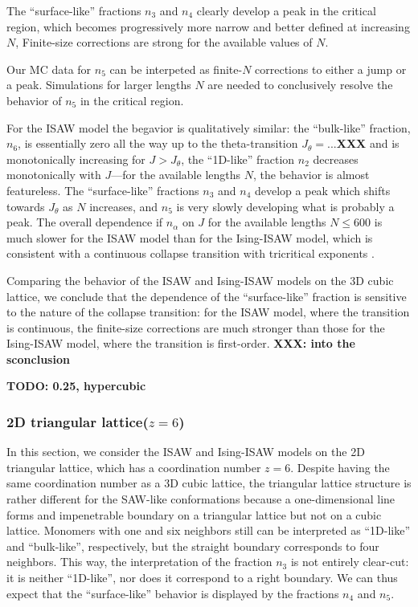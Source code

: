 \documentclass[a4paper]{jpconf}
\begin{document}
The ``surface-like'' fractions $n_3$ and $n_4$ clearly develop a peak in the
critical region, which becomes progressively more narrow and better defined 
at increasing $N$, Finite-size corrections are strong for the available values of $N$. 

Our MC data for $n_5$ can be interpeted as
finite-$N$ corrections to either a jump or a peak. Simulations for 
larger lengths $N$ are needed to conclusively resolve the behavior of $n_5$
in the critical region. 

For the ISAW model the begavior is qualitatively similar: the ``bulk-like''
fraction, $n_6$, is essentially zero all the way up to the theta-transition $J_\theta =...$\textbf{XXX}
and is monotonically increasing for $J > J_\theta$, the ``1D-like'' fraction $n_2$
decreases monotonically with $J$---for the available lengths $N$, the behavior
is almost featureless. The ``surface-like'' fractions $n_3$ and $n_4$ develop
a peak which shifts towards $J_\theta$ as $N$ increases, and $n_5$ is very
slowly developing what is probably a peak. 
The overall dependence if $n_\alpha$ on $J$ for the available lengths
$N \leqslant 600$ is much slower for the ISAW model than for the Ising-ISAW
model, which is consistent with a continuous collapse transition with tricritical
exponents \cite{Vanderzande}.

Comparing the behavior of the ISAW and Ising-ISAW models on the 3D cubic lattice,
we conclude that the dependence of the ``surface-like'' fraction is sensitive
to the nature of the collapse transition: for the ISAW model, where the transition
is continuous, the finite-size corrections are much stronger than those for the
Ising-ISAW model, where the transition is first-order. \textbf{XXX: into the sconclusion}

\textbf{TODO: 0.25, hypercubic}

\subsubsection{2D triangular lattice($z=6$) }

In this section, we consider the ISAW and Ising-ISAW models on the 2D triangular
lattice, which has a coordination number $z=6$. Despite having the same coordination
number as a 3D cubic lattice, the triangular lattice structure is rather
different for the SAW-like conformations because a one-dimensional line forms
and impenetrable boundary on a triangular lattice but not on a cubic lattice. 
Monomers with one and six neighbors still can be interpreted as ``1D-like'' and
``bulk-like'', respectively, but the straight boundary corresponds to four neighbors.
This way, the interpretation of the fraction $n_3$ is not entirely clear-cut: it is
neither ``1D-like'', nor does it correspond to a right boundary.
We can thus expect that the ``surface-like'' behavior is displayed by the fractions
$n_4$ and $n_5$.
\end{document}
